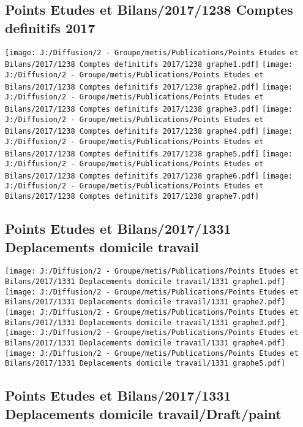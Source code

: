 \documentclass[
]{article}
\begin{document}
\hypertarget{points-etudes-et-bilans20171238-comptes-definitifs-2017}{%
\subsection{Points Etudes et Bilans/2017/1238 Comptes definitifs
2017}\label{points-etudes-et-bilans20171238-comptes-definitifs-2017}}

\texttt{[image: J:/Diffusion/2 - Groupe/metis/Publications/Points Etudes et Bilans/2017/1238 Comptes definitifs 2017/1238 graphe1.pdf]}
\texttt{[image: J:/Diffusion/2 - Groupe/metis/Publications/Points Etudes et Bilans/2017/1238 Comptes definitifs 2017/1238 graphe2.pdf]}
\texttt{[image: J:/Diffusion/2 - Groupe/metis/Publications/Points Etudes et Bilans/2017/1238 Comptes definitifs 2017/1238 graphe3.pdf]}
\texttt{[image: J:/Diffusion/2 - Groupe/metis/Publications/Points Etudes et Bilans/2017/1238 Comptes definitifs 2017/1238 graphe4.pdf]}
\texttt{[image: J:/Diffusion/2 - Groupe/metis/Publications/Points Etudes et Bilans/2017/1238 Comptes definitifs 2017/1238 graphe5.pdf]}
\texttt{[image: J:/Diffusion/2 - Groupe/metis/Publications/Points Etudes et Bilans/2017/1238 Comptes definitifs 2017/1238 graphe6.pdf]}
\texttt{[image: J:/Diffusion/2 - Groupe/metis/Publications/Points Etudes et Bilans/2017/1238 Comptes definitifs 2017/1238 graphe7.pdf]}

\hypertarget{points-etudes-et-bilans20171331-deplacements-domicile-travail}{%
\subsection{Points Etudes et Bilans/2017/1331 Deplacements domicile
travail}\label{points-etudes-et-bilans20171331-deplacements-domicile-travail}}

\texttt{[image: J:/Diffusion/2 - Groupe/metis/Publications/Points Etudes et Bilans/2017/1331 Deplacements domicile travail/1331 graphe1.pdf]}
\texttt{[image: J:/Diffusion/2 - Groupe/metis/Publications/Points Etudes et Bilans/2017/1331 Deplacements domicile travail/1331 graphe2.pdf]}
\texttt{[image: J:/Diffusion/2 - Groupe/metis/Publications/Points Etudes et Bilans/2017/1331 Deplacements domicile travail/1331 graphe3.pdf]}
\texttt{[image: J:/Diffusion/2 - Groupe/metis/Publications/Points Etudes et Bilans/2017/1331 Deplacements domicile travail/1331 graphe4.pdf]}
\texttt{[image: J:/Diffusion/2 - Groupe/metis/Publications/Points Etudes et Bilans/2017/1331 Deplacements domicile travail/1331 graphe5.pdf]}

\hypertarget{points-etudes-et-bilans20171331-deplacements-domicile-travaildraftpaint}{%
\subsection{Points Etudes et Bilans/2017/1331 Deplacements domicile
travail/Draft/paint}\label{points-etudes-et-bilans20171331-deplacements-domicile-travaildraftpaint}}
\end{document}
